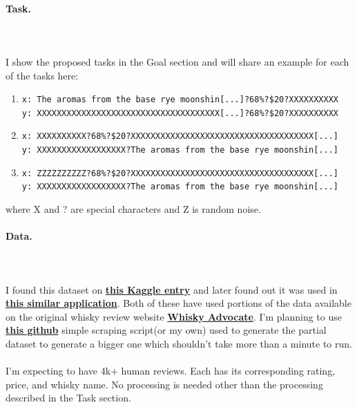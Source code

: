 \documentclass{article}
\begin{document}
\paragraph{Task.} $ $
\\\\I show the proposed tasks in the Goal section and will share an example for each of the tasks here:
\begin{enumerate}
\item  \texttt{x: The aromas from the base rye moonshin[...]?68\%?\$20?XXXXXXXXXX
         \\y: XXXXXXXXXXXXXXXXXXXXXXXXXXXXXXXXXXXXX[...]?68\%?\$20?XXXXXXXXXX}
\item  \texttt{x:  XXXXXXXXXX?68\%?\$20?XXXXXXXXXXXXXXXXXXXXXXXXXXXXXXXXXXXXX[...]
\\y: XXXXXXXXXXXXXXXXXX?The aromas from the base rye moonshin[...]}
\item  \texttt{x:  ZZZZZZZZZZ?68\%?\$20?XXXXXXXXXXXXXXXXXXXXXXXXXXXXXXXXXXXXX[...]
\\y: XXXXXXXXXXXXXXXXXX?The aromas from the base rye moonshin[...]}
\end{enumerate}
where X and ? are special characters and Z is random noise.
\paragraph{Data.}$ $
\\\\I found this dataset on \href{https://www.kaggle.com/koki25ando/22000-scotch-whisky-reviews}{\textbf{this Kaggle entry}} and later found out it was used in \href{https://johnpaton.net/posts/whiskey-reviews/}{\textbf{this similar application}}. Both of these have used portions of the data available on the original whisky review website \href{https://www.whiskyadvocate.com/}{\textbf{Whisky Advocate}}. I'm planning to use \href{https://github.com/koki25ando/Whisky-Data-Scraping/blob/master/whisky.R}{\textbf{this github}} simple scraping script(or my own) used to generate the partial dataset to generate a bigger one which shouldn't take more than a minute to run.
\\\\ I'm expecting to have 4k+ human reviews. Each has its corresponding rating, price, and whisky name. No processing is needed other than the processing described in the Task section.
\end{document}
